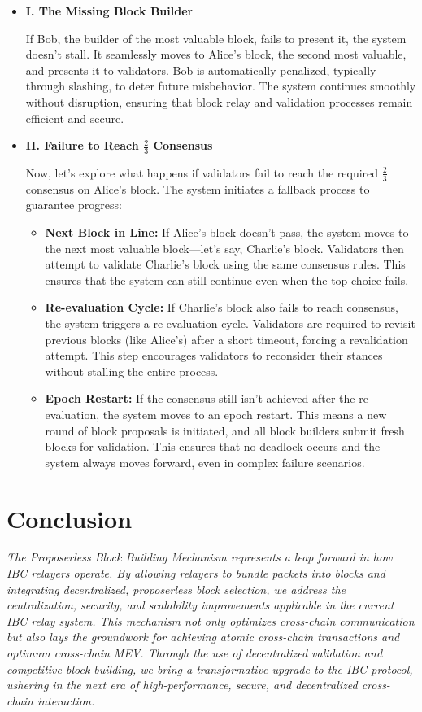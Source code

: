 \documentclass{article}
\begin{document}
\begin{itemize}
    \item \textbf{I. The Missing Block Builder}

    If Bob, the builder of the most valuable block, fails to present it, the system doesn't stall. It seamlessly moves to Alice's block, the second most valuable, and presents it to validators. Bob is automatically penalized, typically through slashing, to deter future misbehavior. The system continues smoothly without disruption, ensuring that block relay and validation processes remain efficient and secure.

    \item \textbf{II. Failure to Reach $\frac{2}{3}$ Consensus}

    Now, let's explore what happens if validators fail to reach the required $\frac{2}{3}$ consensus on Alice's block. The system initiates a fallback process to guarantee progress:

    \begin{itemize}
        \item \textbf{Next Block in Line:} If Alice's block doesn't pass, the system moves to the next most valuable block---let's say, Charlie's block. Validators then attempt to validate Charlie's block using the same consensus rules. This ensures that the system can still continue even when the top choice fails.
        \item \textbf{Re-evaluation Cycle:} If Charlie's block also fails to reach consensus, the system triggers a re-evaluation cycle. Validators are required to revisit previous blocks (like Alice's) after a short timeout, forcing a revalidation attempt. This step encourages validators to reconsider their stances without stalling the entire process.
        \item \textbf{Epoch Restart:} If the consensus still isn't achieved after the re-evaluation, the system moves to an epoch restart. This means a new round of block proposals is initiated, and all block builders submit fresh blocks for validation. This ensures that no deadlock occurs and the system always moves forward, even in complex failure scenarios.
    \end{itemize}

\end{itemize}

\section{Conclusion}

\emph{The Proposerless Block Building Mechanism represents a leap forward in how IBC relayers operate. By allowing relayers to bundle packets into blocks and integrating decentralized, proposerless block selection, we address the centralization, security, and scalability improvements applicable in the current IBC relay system. This mechanism not only optimizes cross-chain communication but also lays the groundwork for achieving atomic cross-chain transactions and optimum cross-chain MEV. Through the use of decentralized validation and competitive block building, we bring a transformative upgrade to the IBC protocol, ushering in the next era of high-performance, secure, and decentralized cross-chain interaction.}
\end{document}
